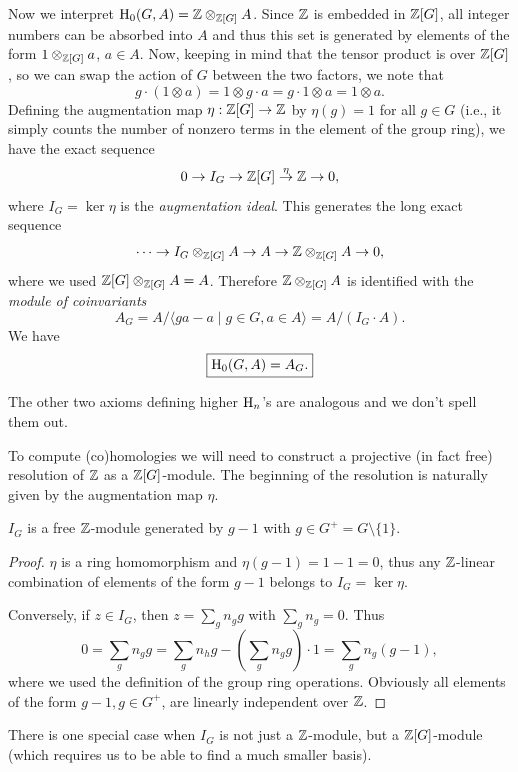 Now we interpret $\mathrm{H}_0(G,A)=\mathbb{Z}\otimes_{\mathbb{Z}[G]}A$. Since $\mathbb{Z}$ is embedded in $\mathbb{Z}[G]$, all integer numbers can be absorbed into $A$  and thus this set is generated by elements of the form $1\otimes_{\mathbb{Z}[G]} a$, $a\in A$. Now, keeping in mind that the tensor product is over $\mathbb{Z}[G]$, so we can swap the action of $G$ between the two factors, we note that
\[g\cdot (1\otimes a)=1\otimes g\cdot a=g\cdot 1\otimes a=1\otimes a.\]
Defining the augmentation map $\eta:\mathbb{Z}[G]\to \mathbb{Z}$ by $\eta(g)=1$ for all $g\in G$ (i.e., it simply counts the number of nonzero terms in the element of the group ring), we have the exact sequence
\[0\to I_G\to \mathbb{Z}[G]\overset{\eta}{\to} \mathbb{Z}\to 0,\]
where $I_G=\ker \eta$ is the \emph{augmentation ideal}. This generates the long exact sequence
\[\cdots\to I_G\otimes_{\mathbb{Z}[G]}A\to A\to \mathbb{Z}\otimes_{\mathbb{Z}[G]}A\to 0,\]
where we used $\mathbb{Z}[G]\otimes_{\mathbb{Z}[G]}A=A$. Therefore $\mathbb{Z}\otimes_{\mathbb{Z}[G]}A$ is identified with the \emph{module of coinvariants}
\[A_G=A\slash \langle ga-a\mid g\in G,a\in A\rangle=A\slash (I_G\cdot A).\]
We have
\[\boxed{\mathrm{H}_0(G,A)=A_G.}\]

The other two axioms defining higher $\mathrm{H}_n$'s are analogous and we don't spell them out.

To compute (co)homologies we will need to construct a projective (in fact free) resolution of $\mathbb{Z}$ as a $\mathbb{Z}[G]$-module. The beginning of the resolution is naturally given by the augmentation map $\eta$.

\begin{thm}
    $I_G$ is a free $\mathbb{Z}$-module generated by $g-1$ with $g\in G^+=G\setminus\{1\}$.
\end{thm}
\begin{proof}
    $\eta$ is a ring homomorphism and $\eta(g-1)=1-1=0$, thus any $\mathbb{Z}$-linear combination of elements of the form $g-1$ belongs to $I_G=\ker \eta$.

    Conversely, if $z\in I_G$, then $z=\sum_g n_g g$ with $\sum_g n_g=0$. Thus 
    \[0=\sum_g n_g g=\sum_g n_hg-\left(\sum_g n_gg\right)\cdot 1=\sum_g n_g(g-1),\]
    where we used the definition of the group ring operations. Obviously all elements of the form $g-1, g\in G^+$, are linearly independent over $\mathbb{Z}$.
\end{proof}

There is one special case when $I_G$ is not just a $\mathbb{Z}$-module, but a $\mathbb{Z}[G]$-module (which requires us to be able to find a much smaller basis).

